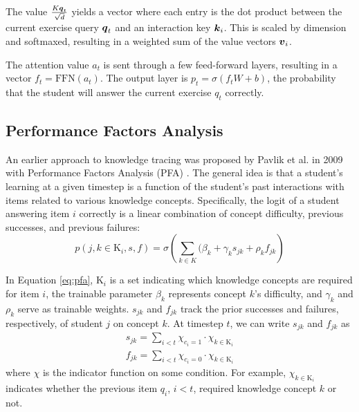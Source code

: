The value $\frac{K \boldsymbol{q}_t}{\sqrt{d}}$ yields a vector where each entry is the dot product between the current exercise query $\boldsymbol{q}_t$ and an interaction key $\boldsymbol{k}_i$. This is scaled by dimension and softmaxed, resulting in a weighted sum of the value vectors $\boldsymbol{v}_i$.

The attention value $a_t$ is sent through a few feed-forward layers, resulting in a vector $f_t = \text{FFN}(a_t)$. The output layer is $p_t = \sigma(f_t W + b)$, the probability that the student will answer the current exercise $q_t$ correctly.


\subsection{Performance Factors Analysis}
An earlier approach to knowledge tracing was proposed by Pavlik et al. in 2009 with Performance Factors Analysis (PFA) \cite{pavlik2009}. The general idea is that a student's learning at a given timestep is a function of the student's past interactions with items related to various knowledge concepts. Specifically, the logit of a student answering item $i$ correctly is a linear combination of concept difficulty, previous successes, and previous failures:
\begin{equation}
  p(j,k\in \text{K}_i, s, f) = \sigma\left(\sum_{k \in K}(\beta_k + \gamma_k s_{jk} + \rho_k f_{jk}\right)
  \label{eq:pfa}
\end{equation}

In Equation \ref{eq:pfa}, $\text{K}_i$ is a set indicating which knowledge concepts are required for item $i$, the trainable parameter $\beta_k$ represents concept $k$'s difficulty, and $\gamma_k$ and $\rho_k$ serve as trainable weights. $s_{jk}$ and $f_{jk}$ track the prior successes and failures, respectively, of student $j$ on concept $k$. At timestep $t$, we can write $s_{jk}$ and $f_{jk}$ as 
\begin{equation}
  \begin{split}
    s_{jk} = \sum_{i<t} \chi_{c_i=1} \cdot \chi_{k \in \text{K}_i} \\
    f_{jk} = \sum_{i<t} \chi_{c_i=0} \cdot \chi_{k \in \text{K}_i}
  \end{split}
  \label{eq:pfa_indicator}
\end{equation}
where $\chi$ is the indicator function on some condition. For example, $\chi_{k\in \text{K}_i}$ indicates whether the previous item $q_i$, $i<t$, required knowledge concept $k$ or not.

